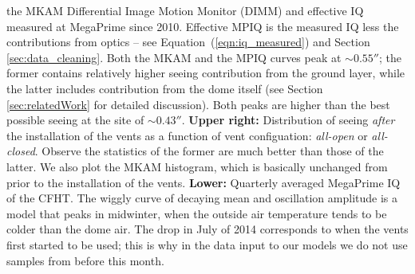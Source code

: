 \begin{figure*}
{the MKAM Differential Image Motion Monitor (DIMM) and effective IQ measured at MegaPrime since 2010. Effective MPIQ is the measured IQ less the contributions from optics -- see Equation~(\ref{eqn:iq_measured}) and Section \ref{sec:data_cleaning}. Both the MKAM and the MPIQ curves peak at $\sim 0.55''$; the former contains relatively higher seeing contribution from the ground layer, while the latter includes contribution from the dome itself (see Section \ref{sec:relatedWork} for detailed discussion). Both peaks are higher than the best possible seeing at the site of $\sim0.43''$. \textbf{Upper right:} Distribution of seeing {\it after} the installation of the vents as a function of vent configuation: \textit{all-open} or \textit{all-closed}.  Observe the statistics of the former are much better than those of the latter.  We also plot the MKAM histogram, which is basically unchanged from prior to the installation of the vents.  \textbf{Lower:} Quarterly averaged MegaPrime IQ of the CFHT. The wiggly curve of decaying mean and oscillation amplitude is a model that peaks in midwinter, when the outside air temperature tends to be colder than the dome air. The drop in July of 2014 corresponds to when the vents first started to be used; this is why in the data input to our models we do not use samples from before this month.}%
\label{fig:hist_preliminaries}
\end{figure*}

